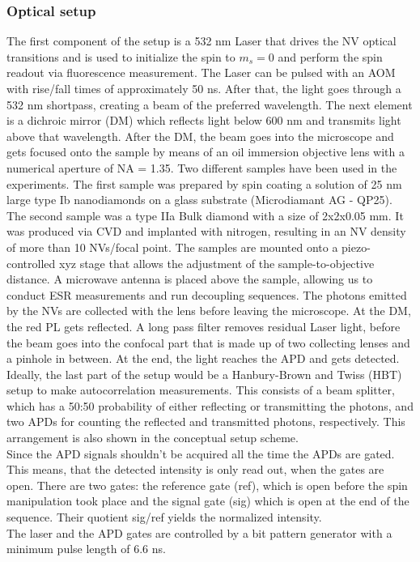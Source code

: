 \documentclass[12pt,a4paper]{article}
\begin{document}
\subsubsection{Optical setup}
The first component of the setup is a 532 nm Laser that drives the NV optical transitions and is used to initialize the spin to $m_s=0$ and perform the spin readout via fluorescence measurement. The Laser can be pulsed with an AOM with rise/fall times of approximately 50 ns. After that, the light goes through a 532 nm shortpass, creating a beam of the preferred wavelength. The next element is a dichroic mirror (DM) which reflects light below 600 nm and transmits light above that wavelength. After the DM, the beam goes into the microscope and gets focused onto the sample by means of an oil immersion objective lens with a numerical aperture of NA = 1.35. Two different samples have been used in the experiments. The first sample was prepared by spin coating a solution of 25 nm large type Ib nanodiamonds on a glass substrate (Microdiamant AG - QP25). The second sample was a type IIa Bulk diamond with a size of 2x2x0.05 mm. It was produced via CVD and implanted with nitrogen, resulting in an NV density of more than 10 NVs/focal point. The samples are mounted onto a piezo-controlled xyz stage that allows the adjustment of the sample-to-objective distance. A microwave antenna is placed above the sample, allowing us to conduct ESR measurements and run decoupling sequences. The photons emitted by the NVs are collected with the lens before leaving the microscope. At the DM, the red PL gets reflected. A long pass filter removes residual Laser light, before the beam goes into the confocal part that is made up of two collecting lenses and a pinhole in between.
At the end, the light reaches the APD and gets detected. Ideally, the last part of the setup would be a Hanbury-Brown and Twiss (HBT) setup to make autocorrelation measurements. This consists of a beam splitter, which has a 50:50 probability of either reflecting or transmitting the photons, and two APDs for counting the reflected and transmitted photons, respectively. This arrangement is also shown in the conceptual setup scheme.\\
Since the APD signals shouldn't be acquired all the time the APDs are gated. This means, that the detected intensity is only read out, when the gates are open. There are two gates: the reference gate (ref), which is open before the spin manipulation took place and the signal gate (sig) which is open at the end of the sequence. Their quotient sig/ref yields the normalized intensity. \\
The laser and the APD gates are controlled by a bit pattern generator with a minimum pulse length of 6.6 ns.
\end{document}
